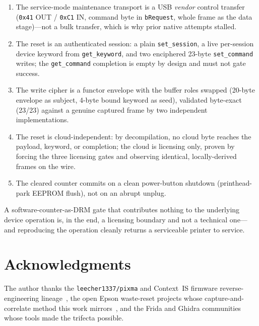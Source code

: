 \documentclass[conference]{IEEEtran}
\begin{document}
\begin{enumerate}
\item The service-mode maintenance transport is a USB \emph{vendor}
  control transfer (\texttt{0x41} OUT / \texttt{0xC1} IN, command byte in
  \texttt{bRequest}, whole frame as the data stage)---not a bulk transfer,
  which is why prior native attempts stalled.
\item The reset is an authenticated session: a plain \texttt{set\_session},
  a live per-session device keyword from \texttt{get\_keyword}, and two
  enciphered 23-byte \texttt{set\_command} writes; the \texttt{get\_command}
  completion is empty by design and must not gate success.
\item The write cipher is a functor envelope with the buffer roles swapped
  (20-byte envelope as subject, 4-byte bound keyword as seed), validated
  byte-exact (23/23) against a genuine captured frame by two independent
  implementations.
\item The reset is cloud-independent: by decompilation, no cloud byte
  reaches the payload, keyword, or completion; the cloud is licensing
  only, proven by forcing the three licensing gates and observing
  identical, locally-derived frames on the wire.
\item The cleared counter commits on a clean power-button shutdown
  (printhead-park EEPROM flush), not on an abrupt unplug.
\end{enumerate}

A software-counter-as-DRM gate that contributes nothing to the underlying
device operation is, in the end, a licensing boundary and not a technical
one---and reproducing the operation cleanly returns a serviceable printer
to service.

\section*{Acknowledgments}

The author thanks the \texttt{leecher1337/pixma} and Context~IS firmware
reverse-engineering lineage~\cite{leecher-pixma,contextis-canon}, the open
Epson waste-reset projects whose capture-and-correlate method this work
mirrors~\cite{reink-elena,ircama-epson-print-conf,zedeldi-epson-snmp}, and
the Frida and Ghidra communities~\cite{frida,ghidra} whose tools made the
trifecta possible.

\balance


\end{document}

